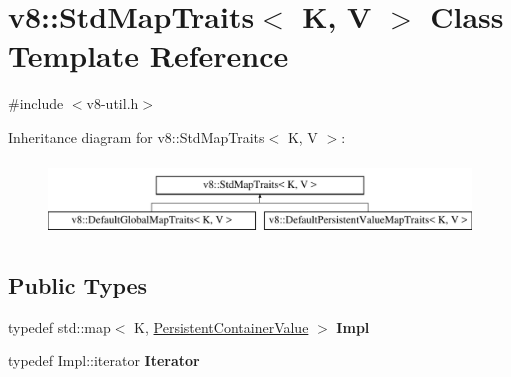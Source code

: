 \hypertarget{classv8_1_1StdMapTraits}{}\section{v8\+:\+:Std\+Map\+Traits$<$ K, V $>$ Class Template Reference}
\label{classv8_1_1StdMapTraits}


{\ttfamily \#include $<$v8-\/util.\+h$>$}

Inheritance diagram for v8\+:\+:Std\+Map\+Traits$<$ K, V $>$\+:\begin{figure}[H]
\begin{center}
\leavevmode
\includegraphics[height=2.000000cm]{classv8_1_1StdMapTraits}
\end{center}
\end{figure}
\subsection*{Public Types}
\begin{DoxyCompactItemize}
\item 
\mbox{\label{classv8_1_1StdMapTraits_ac64cb78b3ef5cfbc35cf03837552e4ea}} 
typedef std\+::map$<$ K, \mbox{\hyperlink{classuintptr__t}{Persistent\+Container\+Value}} $>$ {\bfseries Impl}
\item 
\mbox{\label{classv8_1_1StdMapTraits_ad20ef2022e83bfba6dcee23a2a34098e}} 
typedef Impl\+::iterator {\bfseries Iterator}
\end{DoxyCompactItemize}
